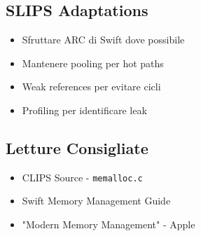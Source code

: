 \subsection{SLIPS Adaptations}

\begin{itemize}
\item Sfruttare ARC di Swift dove possibile
\item Mantenere pooling per hot paths
\item Weak references per evitare cicli
\item Profiling per identificare leak
\end{itemize}

\subsection{Letture Consigliate}

\begin{itemize}
\item CLIPS Source - \texttt{memalloc.c}
\item Swift Memory Management Guide
\item "Modern Memory Management" - Apple
\end{itemize}
